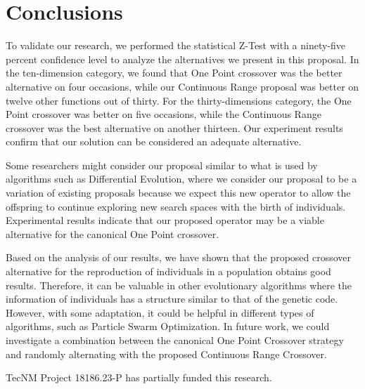 \documentclass[graybox]{svmult}
\begin{document}
    \FloatBarrier

\section{Conclusions}
    \label{section.conclusions}

    To validate our research, we performed the statistical Z-Test with a ninety-five percent confidence level to analyze the alternatives we present in this proposal. In the ten-dimension category, we found that One Point crossover was the better alternative on four occasions, while our Continuous Range proposal was better on twelve other functions out of thirty. For the thirty-dimensions category, the One Point crossover was better on five occasions, while the Continuous Range crossover was the best alternative on another thirteen. Our experiment results confirm that our solution can be considered an adequate alternative.

    Some researchers might consider our proposal similar to what is used by algorithms such as Differential Evolution, where we consider our proposal to be a variation of existing proposals because we expect this new operator to allow the offspring to continue exploring new search spaces with the birth of individuals. Experimental results indicate that our proposed operator may be a viable alternative for the canonical One Point crossover.

    Based on the analysis of our results, we have shown that the proposed crossover alternative for the reproduction of individuals in a population obtains good results. Therefore, it can be valuable in other evolutionary algorithms where the information of individuals has a structure similar to that of the genetic code. However, with some adaptation, it could be helpful in different types of algorithms, such as Particle Swarm Optimization. In future work, we could investigate a combination between the canonical One Point Crossover strategy and randomly alternating with the proposed Continuous Range Crossover.


\begin{acknowledgement}
    TecNM Project 18186.23-P has partially funded this research.
\end{acknowledgement}

%


%

\end{document}
